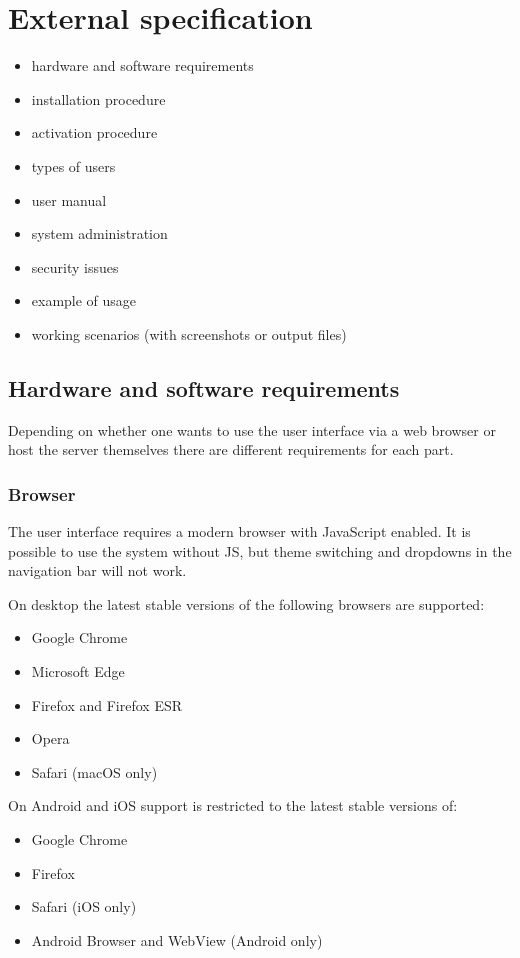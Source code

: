 \chapter{External specification}
\begin{itemize}
\item hardware and software requirements
\item installation procedure
\item activation procedure
\item types of users
\item user manual
\item system administration
\item security issues
\item example of usage
\item working scenarios (with screenshots or output files)
\end{itemize}

\section{Hardware and software requirements}

Depending on whether one wants to use the user interface via a web browser or host the server themselves there are different requirements for each part.

\subsection{Browser}

The user interface requires a modern browser with JavaScript enabled. It is possible to use the system without JS, but theme switching and dropdowns in the navigation bar will not work.

On desktop the latest stable versions of the following browsers are supported:

\begin{itemize}
    \item Google Chrome
    \item Microsoft Edge
    \item Firefox and Firefox ESR
    \item Opera
    \item Safari (macOS only)
\end{itemize}

On Android and iOS support is restricted to the latest stable versions of:

\begin{itemize}
    \item Google Chrome
    \item Firefox
    \item Safari (iOS only)
    \item Android Browser and WebView (Android only)
\end{itemize}

